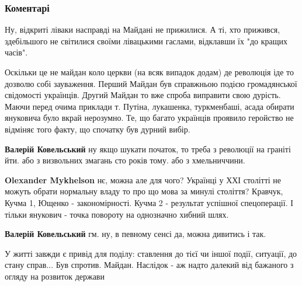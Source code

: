  
 
 
 
 
\subsubsection{Коментарі}
\label{sec:21_11_2021.fb.myhelson_oleksandr.1.gidnist_svoboda.cmt}

\begin{itemize} %

Ну, відкриті ліваки насправді на Майдані не прижилися. А ті, хто прижився,
здебільшого не світилися своїми лівацькими гаслами, відклавши їх "до кращих
часів".


Оскільки це не майдан коло церкви (на всяк випадок додам) де революція іде то дозволю собі зауваження.
Перший Майдан був справжньою подією громадянської свідомості українців.
Другий Майдан то вже спроба виправити свою дурість. Маючи перед очима приклади т. Путіна, лукашенка, туркменбаші, асада обирати януковича було вкрай нерозумно.
Те, що багато українців проявило геройство не відміняє того факту, що спочатку був дурний вибір.

\begin{itemize} %
\textbf{Валерій Ковельський} ну якщо шукати початок, то треба з революції на граніті йти. або з визвольних змагань сто років тому. або з хмельниччини.

\textbf{Olexander Mykhelson} нє, можна але для чого?
Українці у ХХІ столітті не можуть обрати нормальну владу то про що мова за минулі століття?
Кравчук, Кучма 1, Ющенко - закономірності. Кучма 2 - результат успішної спецоперації.
І тільки янукович - точка повороту на однозначно хибний шлях.

\textbf{Валерій Ковельський} гм. ну, в певному сенсі да, можна дивитись і так.
\end{itemize} %


У житті завжди є привід для поділу: ставлення до тієї чи іншої події, ситуації,
до стану справ... Був спротив. Майдан. Наслідок - аж надто далекий від бажаного
з огляду на розвиток держави



\end{itemize}
